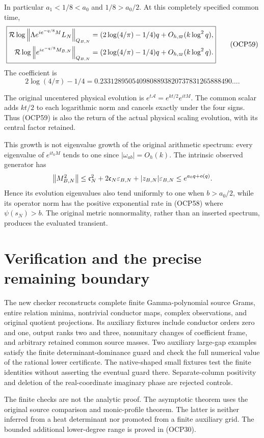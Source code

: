 \documentclass[10pt]{article}
\newcommand{\Rr}{\mathcal R}\newcommand{\tr}{\operatorname{Tr}}
\begin{document}
In particular $a_1<1/8<a_0$ and $1/8>a_0/2$. At this completely specified common time,
\[
 \boxed{\begin{aligned}
 \Rr\log\norm{\Lambda e^{ie^{-q/8}M}L_N}_{Q_{B,N}}
 &=(2\log(4/\pi)-1/4)q+O_{h,\varpi}(k\log^2q),\\
 \Rr\log\norm{e^{ie^{-q/8}M_{B,N}}}_{Q_{B,N}}
 &=(2\log(4/\pi)-1/4)q+O_{h,\varpi}(k\log^2q).
 \end{aligned}}
 \tag{OCP59}
\]
The coefficient is
\[
 2\log(4/\pi)-1/4
 =0.2331289505409808893820737831265888490\ldots.
\]

The original uncentered physical evolution is $e^{t\mathscr A}=e^{kt/2}e^{itM}$. The common scalar adds $kt/2$ to each logarithmic norm and cancels exactly under the four signs. Thus (OCP59) is also the return of the actual physical scaling evolution, with its central factor retained.

This growth is not eigenvalue growth of the original arithmetic spectrum: every eigenvalue of $e^{it_kM}$ tends to one since $|\omega_{ab}|=O_h(k)$. The intrinsic observed generator has
\[
 \left\lVert M_{B,N}^2\right\rVert\le
 \mathfrak c_N^2+2\mathfrak c_N\varepsilon_{B,N}
 +|z_{B,N}|\varepsilon_{B,N}\le e^{a_0q+o(q)}.
\]
Hence its evolution eigenvalues also tend uniformly to one when $b>a_0/2$, while its operator norm has the positive exponential rate in (OCP58) where $\psi(s_N)>b$. The original metric nonnormality, rather than an inserted spectrum, produces the evaluated transient.

\section{Verification and the precise remaining boundary}
The new checker reconstructs complete finite Gamma-polynomial source Grams, entire relation minima, nontrivial conductor maps, complex observations, and original quotient projections. Its auxiliary fixtures include conductor orders zero and one, output ranks two and three, nonunitary changes of coefficient frame, and arbitrary retained common source masses. Two auxiliary large-gap examples satisfy the finite determinant-dominance guard and check the full numerical value of the rational lower certificate. The native-shaped small fixtures test the finite identities without asserting the eventual guard there. Separate-column positivity and deletion of the real-coordinate imaginary phase are rejected controls.

The finite checks are not the analytic proof. The asymptotic theorem uses the original source comparison and monic-profile theorem. The latter is neither inferred from a heat determinant nor promoted from a finite auxiliary grid. The bounded additional lower-degree range is proved in (OCP30).
\end{document}
